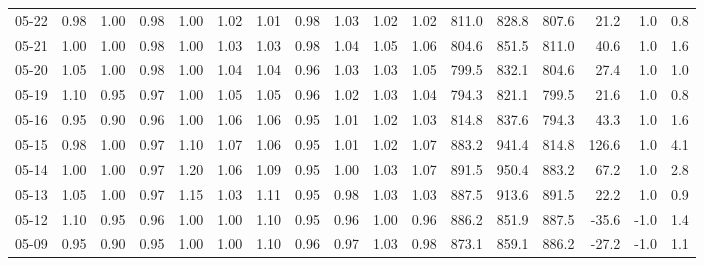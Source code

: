 \begin{threeparttable}
{\begin{tabular}{lrrrrrrrrrrrrrrrr}
  05-22 &   0.98 &   1.00 &         0.98 &     1.00 &           1.02 &        1.01 &        0.98 &        1.03 &          1.02 &          1.02 & 811.0 & 828.8 & 807.6 &       21.2 &                      1.0 &                 0.8 \\
  05-21 &   1.00 &   1.00 &         0.98 &     1.00 &           1.03 &        1.03 &        0.98 &        1.04 &          1.05 &          1.06 & 804.6 & 851.5 & 811.0 &       40.6 &                      1.0 &                 1.6 \\
  05-20 &   1.05 &   1.00 &         0.98 &     1.00 &           1.04 &        1.04 &        0.96 &        1.03 &          1.03 &          1.05 & 799.5 & 832.1 & 804.6 &       27.4 &                      1.0 &                 1.0 \\
  05-19 &   1.10 &   0.95 &         0.97 &     1.00 &           1.05 &        1.05 &        0.96 &        1.02 &          1.03 &          1.04 & 794.3 & 821.1 & 799.5 &       21.6 &                      1.0 &                 0.8 \\
  05-16 &   0.95 &   0.90 &         0.96 &     1.00 &           1.06 &        1.06 &        0.95 &        1.01 &          1.02 &          1.03 & 814.8 & 837.6 & 794.3 &       43.3 &                      1.0 &                 1.6 \\
  05-15 &   0.98 &   1.00 &         0.97 &     1.10 &           1.07 &        1.06 &        0.95 &        1.01 &          1.02 &          1.07 & 883.2 & 941.4 & 814.8 &      126.6 &                      1.0 &                 4.1 \\
  05-14 &   1.00 &   1.00 &         0.97 &     1.20 &           1.06 &        1.09 &        0.95 &        1.00 &          1.03 &          1.07 & 891.5 & 950.4 & 883.2 &       67.2 &                      1.0 &                 2.8 \\
  05-13 &   1.05 &   1.00 &         0.97 &     1.15 &           1.03 &        1.11 &        0.95 &        0.98 &          1.03 &          1.03 & 887.5 & 913.6 & 891.5 &       22.2 &                      1.0 &                 0.9 \\
  05-12 &   1.10 &   0.95 &         0.96 &     1.00 &           1.00 &        1.10 &        0.95 &        0.96 &          1.00 &          0.96 & 886.2 & 851.9 & 887.5 &      -35.6 &                     -1.0 &                 1.4 \\
  05-09 &   0.95 &   0.90 &         0.95 &     1.00 &           1.00 &        1.10 &        0.96 &        0.97 &          1.03 &          0.98 & 873.1 & 859.1 & 886.2 &      -27.2 &                     -1.0 &                 1.1 \\

\end{tabular}}
\end{threeparttable}
